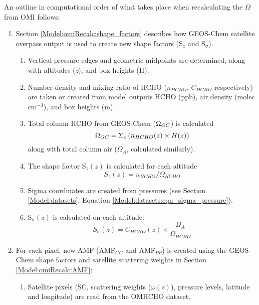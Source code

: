     An outline in computational order of what takes place when recalculating the $\Omega$ from OMI follows:
    \begin{enumerate}
      \item Section \ref{Model:omiRecalc:shape_factors} describes how GEOS-Chem satellite overpass output %
        is used to create new shape factors (S$_z$ and S$_\sigma$).
      \begin{enumerate}
        \item Vertical pressure edges and geometric midpoints are determined, along with altitudes (\textit{z}), and box heights (H).
        \item Number density and mixing ratio of HCHO ($n_{HCHO}$, $C_{HCHO}$ respectively) are taken or created from model outputs HCHO (ppb), air density (molec cm$^{-3}$), and box heights (m).
        \item Total column HCHO from GEOS-Chem ($\Omega_{GC}$) is calculated 
        \begin{equation*}
          \Omega_{GC} = \Sigma_z \left(n_{HCHO}(z) \times H(z) \right)
        \end{equation*}
        along with total column air ($\Omega_{A}$, calculated similarly).
        \item The shape factor S$_z(z)$ is calculated for each altitude 
        \begin{equation*}
          S_z(z) = n_{HCHO} / \Omega_{HCHO}
        \end{equation*}
        \item Sigma coordinates are created from pressures (see Section \ref{Model:datasets}, Equation \ref{Model:datasets:eqn_sigma_pressure}).
        \item S$_\sigma(z)$ is calculated on each altitude: 
        \begin{equation*}
          S_\sigma(z) = C_{HCHO}(z) \times \frac{\Omega_A}{\Omega_{HCHO}}
        \end{equation*}
      \end{enumerate}
      \item For each pixel, new AMF (AMF$_{GC}$ and AMF$_{PP}$) is created using the GEOS-Chem shape factors and satellite scattering weights in Section \ref{Model:omiRecalc:AMF}:
      \begin{enumerate}
        \item Satellite pixels (SC, scattering weights ($\omega(z)$), pressure levels, latitude and longitude) are read from the OMHCHO dataset.

\end{enumerate}
\end{enumerate}
